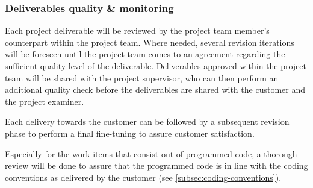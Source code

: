 \subsubsection{Deliverables quality \& monitoring}
Each project deliverable will be reviewed by the project team member's counterpart within the project team.
Where needed, several revision iterations will be foreseen until the project team comes to an agreement regarding the sufficient quality level of the deliverable.
Deliverables approved within the project team will be shared with the project supervisor, who can then perform an additional quality check before the deliverables are shared with the customer and the project examiner.

Each delivery towards the customer can be followed by a subsequent revision phase to perform a final fine-tuning to assure customer satisfaction.

Especially for the work items that consist out of programmed code, a thorough review will be done to assure that the programmed code is in line with the coding conventions as delivered by the customer (see \autoref{subsec:coding-conventions}).
